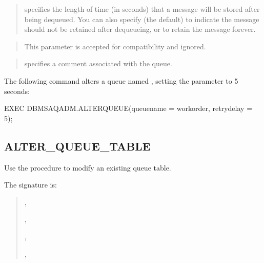 \documentclass[letterpaper,10pt,english,openany,oneside]{sphinxmanual}
\begin{document}
\begin{quote}

 specifies the length of time (in seconds) that a
message will be stored after being dequeued. You can also specify 
(the default) to indicate the message should not be retained after
dequeueing, or  to retain the message forever.
\end{quote}

\begin{quote}

This parameter is accepted for compatibility and ignored.
\end{quote}

\begin{quote}

 specifies a comment associated with the queue.
\end{quote}


The following command alters a queue named , setting the
 parameter to 5 seconds:

%
\begin{sphinxVerbatim}[commandchars=\\\{\}]
EXEC DBMS\PYGZus{}AQADM.ALTER\PYGZus{}QUEUE(queue\PYGZus{}name =\PYGZgt{} \PYGZsq{}work\PYGZus{}order\PYGZsq{}, retry\PYGZus{}delay
=\PYGZgt{} 5);
\end{sphinxVerbatim}

\newpage


\subsection{ALTER\_QUEUE\_TABLE}
\label{\detokenize{alter_queue_table:alter-queue-table}}\label{\detokenize{alter_queue_table::doc}}
Use the  procedure to modify an existing queue table.

The signature is:

\begin{quote}

,

,

,

,
\end{quote}
\end{document}
